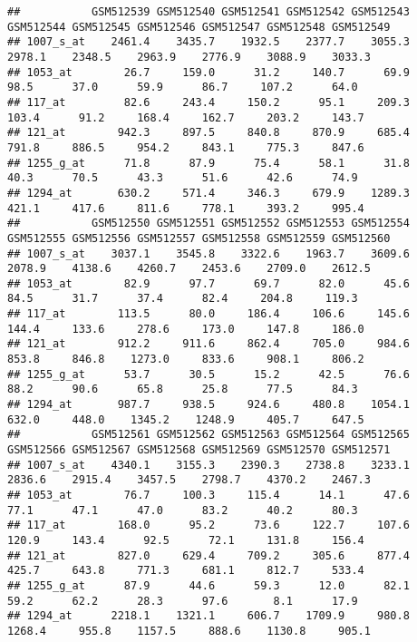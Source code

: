 \documentclass[
]{article}
\begin{document}
\begin{verbatim}
##           GSM512539 GSM512540 GSM512541 GSM512542 GSM512543 GSM512544 GSM512545 GSM512546 GSM512547 GSM512548 GSM512549
## 1007_s_at    2461.4    3435.7    1932.5    2377.7    3055.3    2978.1    2348.5    2963.9    2776.9    3088.9    3033.3
## 1053_at        26.7     159.0      31.2     140.7      69.9      98.5      37.0      59.9      86.7     107.2      64.0
## 117_at         82.6     243.4     150.2      95.1     209.3     103.4      91.2     168.4     162.7     203.2     143.7
## 121_at        942.3     897.5     840.8     870.9     685.4     791.8     886.5     954.2     843.1     775.3     847.6
## 1255_g_at      71.8      87.9      75.4      58.1      31.8      40.3      70.5      43.3      51.6      42.6      74.9
## 1294_at       630.2     571.4     346.3     679.9    1289.3     421.1     417.6     811.6     778.1     393.2     995.4
##           GSM512550 GSM512551 GSM512552 GSM512553 GSM512554 GSM512555 GSM512556 GSM512557 GSM512558 GSM512559 GSM512560
## 1007_s_at    3037.1    3545.8    3322.6    1963.7    3609.6    2078.9    4138.6    4260.7    2453.6    2709.0    2612.5
## 1053_at        82.9      97.7      69.7      82.0      45.6      84.5      31.7      37.4      82.4     204.8     119.3
## 117_at        113.5      80.0     186.4     106.6     145.6     144.4     133.6     278.6     173.0     147.8     186.0
## 121_at        912.2     911.6     862.4     705.0     984.6     853.8     846.8    1273.0     833.6     908.1     806.2
## 1255_g_at      53.7      30.5      15.2      42.5      76.6      88.2      90.6      65.8      25.8      77.5      84.3
## 1294_at       987.7     938.5     924.6     480.8    1054.1     632.0     448.0    1345.2    1248.9     405.7     647.5
##           GSM512561 GSM512562 GSM512563 GSM512564 GSM512565 GSM512566 GSM512567 GSM512568 GSM512569 GSM512570 GSM512571
## 1007_s_at    4340.1    3155.3    2390.3    2738.8    3233.1    2836.6    2915.4    3457.5    2798.7    4370.2    2467.3
## 1053_at        76.7     100.3     115.4      14.1      47.6      77.1      47.1      47.0      83.2      40.2      80.3
## 117_at        168.0      95.2      73.6     122.7     107.6     120.9     143.4      92.5      72.1     131.8     156.4
## 121_at        827.0     629.4     709.2     305.6     877.4     425.7     643.8     771.3     681.1     812.7     533.4
## 1255_g_at      87.9      44.6      59.3      12.0      82.1      59.2      62.2      28.3      97.6       8.1      17.9
## 1294_at      2218.1    1321.1     606.7    1709.9     980.8    1268.4     955.8    1157.5     888.6    1130.8     905.1

\end{verbatim}
\end{document}
